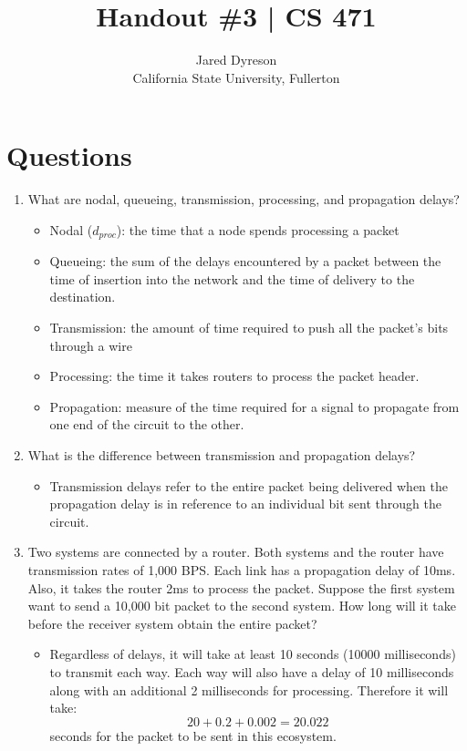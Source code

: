 \documentclass{article}
\title{Handout \#3 | CS 471}
\author{Jared Dyreson\\ 
        California State University, Fullerton}
\begin{document}
\maketitle
\tableofcontents

\newpage

\section{Questions}

\begin{enumerate}

\item What are nodal, queueing, transmission, processing, and propagation delays? 
\begin{itemize}
\item Nodal ($d_{proc}$): the time that a node spends processing a packet
\item Queueing: the sum of the delays encountered by a packet between the time of insertion into the network and the time of delivery to the destination.
\item Transmission: the amount of time required to push all the packet's bits through a wire
\item Processing: the time it takes routers to process the packet header.
\item Propagation: measure of the time required for a signal to propagate from one end of the circuit to the other.
\end{itemize}

\item What is the difference between transmission and propagation delays?
\begin{itemize}
\item Transmission delays refer to the entire packet being delivered when the propagation delay is in reference to an individual bit sent through the circuit.
\end{itemize}

\item Two systems are connected by a router. Both systems and the router have transmission rates of 1,000 BPS. Each link has a propagation delay of 10ms. Also, it takes the router 2ms to process the packet. Suppose the first system want to send a 10,000 bit packet to the second system. How long will it take before the receiver system obtain the entire packet?
\begin{itemize}
\item Regardless of delays, it will take at least 10 seconds (10000 milliseconds) to transmit each way. Each way will also have a delay of 10 milliseconds along with an additional 2 milliseconds for processing. Therefore it will take:
$$ 20+ 0.2 + 0.002 = 20.022 $$ seconds for the packet to be sent in this ecosystem.
\end{itemize}



\end{enumerate}
\end{document}
